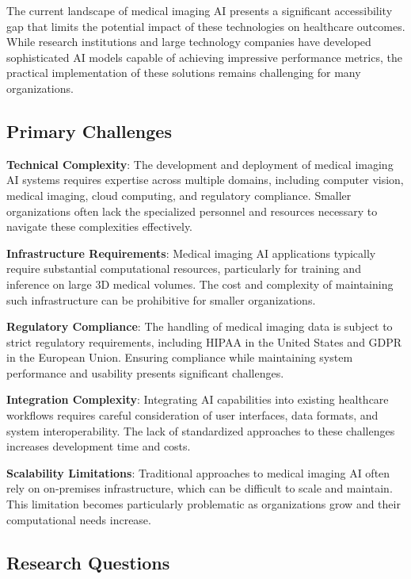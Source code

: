 \documentclass[12pt,a4paper]{article}
\begin{document}
The current landscape of medical imaging AI presents a significant accessibility gap that limits the potential impact of these technologies on healthcare outcomes. While research institutions and large technology companies have developed sophisticated AI models capable of achieving impressive performance metrics, the practical implementation of these solutions remains challenging for many organizations.

\subsection{Primary Challenges}

\textbf{Technical Complexity}: The development and deployment of medical imaging AI systems requires expertise across multiple domains, including computer vision, medical imaging, cloud computing, and regulatory compliance. Smaller organizations often lack the specialized personnel and resources necessary to navigate these complexities effectively.

\textbf{Infrastructure Requirements}: Medical imaging AI applications typically require substantial computational resources, particularly for training and inference on large 3D medical volumes. The cost and complexity of maintaining such infrastructure can be prohibitive for smaller organizations.

\textbf{Regulatory Compliance}: The handling of medical imaging data is subject to strict regulatory requirements, including HIPAA in the United States and GDPR in the European Union. Ensuring compliance while maintaining system performance and usability presents significant challenges.

\textbf{Integration Complexity}: Integrating AI capabilities into existing healthcare workflows requires careful consideration of user interfaces, data formats, and system interoperability. The lack of standardized approaches to these challenges increases development time and costs.

\textbf{Scalability Limitations}: Traditional approaches to medical imaging AI often rely on on-premises infrastructure, which can be difficult to scale and maintain. This limitation becomes particularly problematic as organizations grow and their computational needs increase.

\subsection{Research Questions}
\end{document}
